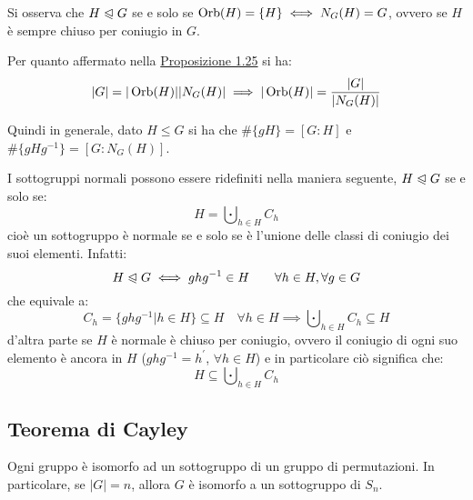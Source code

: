 \documentclass[11pt]{scrartcl}
\begin{document}
\begin{remark}
    Si osserva che $H \trianglelefteqslant G$ se e solo se $\operatorname{Orb}(H) = \{H\} \iff N_G(H) = G$, ovvero se $H$ è sempre chiuso per coniugio in $G$.
\end{remark}

Per quanto affermato nella \hyperref[p:1.25]{Proposizione 1.25} si ha:
    \[ |G| = |\operatorname{Orb}(H)||N_G(H)| \implies |\operatorname{Orb}(H)| = \frac{|G|}{|N_G(H)|}
    \]
\begin{remark}
    Quindi in generale, dato $H \leqslant G$ si ha che $\#\{gH\} = [G:H]$ e $\#\{gHg^{-1}\} = [G : N_G(H)]$.
\end{remark}

\begin{remark}
    I sottogruppi normali possono essere ridefiniti nella maniera seguente, $H \trianglelefteqslant G$ se e solo se:
        \[ H = \bigcupdot_{h \in H} C_h
            \]
    cioè un sottogruppo è normale se e solo se è l'unione delle classi di coniugio dei suoi elementi. Infatti:
        \[ H \trianglelefteqslant G \iff ghg^{-1} \in H \qquad \forall h \in H, \forall g \in G
            \]
    che equivale a:
        \[ C_h = \{ghg^{-1} | h \in H\} \subseteq H  \quad \forall h \in H \implies \bigcupdot_{h \in H} C_h \subseteq H
            \]
    d'altra parte se $H$ è normale è chiuso per coniugio, ovvero il coniugio di ogni suo elemento è ancora in $H$
    ($ghg^{-1} = h^{\prime}$, $\forall h \in H$) e in particolare ciò significa che:
        \[ H \subseteq \bigcupdot_{h \in H} C_h
            \] 
    
\end{remark}

\newpage
\subsection{Teorema di Cayley}

\begin{theorem}
    \label{p:Cayley}
    Ogni gruppo è isomorfo ad un sottogruppo di un gruppo di permutazioni. In particolare, se $|G| = n$, allora 
    $G$ è isomorfo a un sottogruppo di $S_n$.
\end{theorem}
\end{document}
